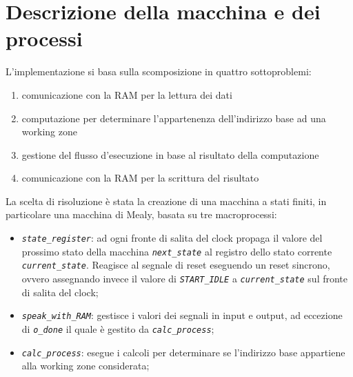 \documentclass[12pt,a4paper,titlepage]{article}
\begin{document}
	\section{Descrizione della macchina e dei processi}
		L'implementazione si basa sulla scomposizione in quattro sottoproblemi:
		\begin{enumerate}
			\item comunicazione con la RAM per la lettura dei dati
			\item computazione per determinare l'appartenenza dell'indirizzo base ad una working zone
			\item gestione del flusso d'esecuzione in base al risultato della computazione
			\item comunicazione con la RAM per la scrittura del risultato
		\end{enumerate}
		La scelta di risoluzione è stata la creazione di una macchina a stati finiti, in particolare una macchina di Mealy, basata su tre macroprocessi:
		\begin{itemize}
			\item \textit{\texttt{state\_register}}: ad ogni fronte di salita del clock propaga il valore del prossimo stato della macchina \textit{\texttt{next\_state}} al registro dello stato corrente \textit{\texttt{current\_state}}. Reagisce al segnale di reset eseguendo un reset sincrono, ovvero assegnando invece il valore di \textit{\texttt{START\_IDLE}} a \textit{\texttt{current\_state}} sul fronte di salita del clock;
			
			\item \textit{\texttt{speak\_with\_RAM}}: gestisce i valori dei segnali in input e output, ad eccezione di \textit{\texttt{o\_done}} il quale è gestito da \textit{\texttt{calc\_process}};
			
			\item \textit{\texttt{calc\_process}}: esegue i calcoli per determinare se l'indirizzo base appartiene alla working zone considerata;
		\end{itemize}
		
\end{document}
